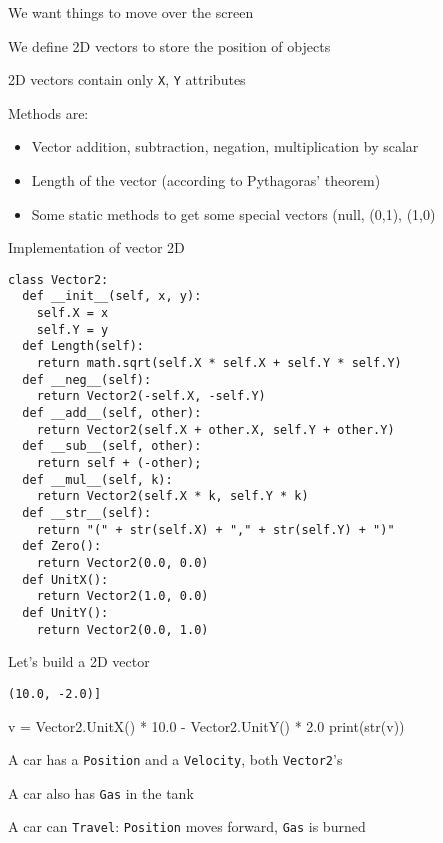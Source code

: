 \documentclass{beamer}
\begin{document}
\begin{slide}{
\item We want things to move over the screen
\item We define 2D vectors to store the position of objects
\item 2D vectors contain only \texttt{X}, \texttt{Y} attributes
\item Methods are:
\begin{itemize}
\item Vector addition, subtraction, negation, multiplication by scalar
\item Length of the vector (according to Pythagoras' theorem)
\item Some static methods to get some special vectors (null, (0,1), (1,0)
\end{itemize}
}\end{slide}

\begin{frame}[fragile]{Implementation of vector 2D}
\begin{lstlisting}
class Vector2:
  def __init__(self, x, y):
    self.X = x
    self.Y = y
  def Length(self):
    return math.sqrt(self.X * self.X + self.Y * self.Y)
  def __neg__(self):
    return Vector2(-self.X, -self.Y)
  def __add__(self, other):
    return Vector2(self.X + other.X, self.Y + other.Y)
  def __sub__(self, other):
    return self + (-other);
  def __mul__(self, k):
    return Vector2(self.X * k, self.Y * k)
  def __str__(self):
    return "(" + str(self.X) + "," + str(self.Y) + ")"
  def Zero(): 
    return Vector2(0.0, 0.0)
  def UnitX(): 
    return Vector2(1.0, 0.0)
  def UnitY(): 
    return Vector2(0.0, 1.0)
\end{lstlisting}
\end{frame}

\begin{frame}[fragile]{Let's build a 2D vector}
\begin{codewithblock}{\pause \item \texttt{(10.0, -2.0)]}}
v = Vector2.UnitX() * 10.0 - Vector2.UnitY() * 2.0
print(str(v))
\end{codewithblock}
\end{frame}

\begin{slide}{
\item A car has a \texttt{Position} and a \texttt{Velocity}, both \texttt{Vector2}'s
\item A car also has \texttt{Gas} in the tank
\item A car can \texttt{Travel}: \texttt{Position} moves forward, \texttt{Gas} is burned
}\end{slide}
\end{document}
